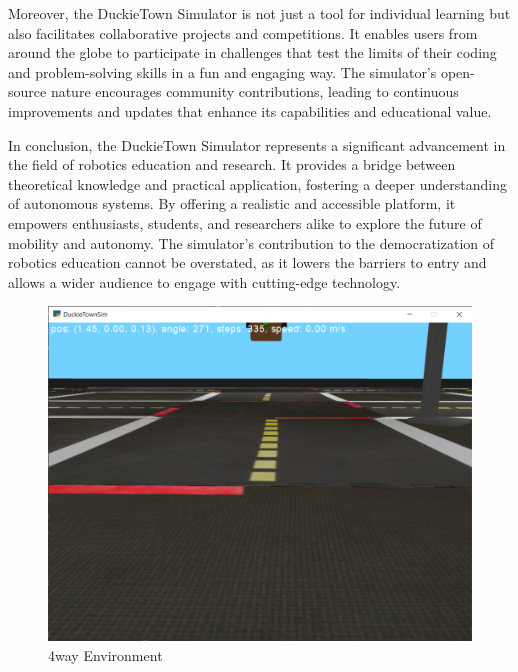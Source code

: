 \begin{spacing}{1.5}
\begin{sloppypar}
Moreover, the DuckieTown Simulator is not just a tool for individual learning but also facilitates collaborative projects and competitions. It enables users from around the globe to participate in challenges that test the limits of their coding and problem-solving skills in a fun and engaging way. The simulator's open-source nature encourages community contributions, leading to continuous improvements and updates that enhance its capabilities and educational value.

In conclusion, the DuckieTown Simulator represents a significant advancement in the field of robotics education and research. It provides a bridge between theoretical knowledge and practical application, fostering a deeper understanding of autonomous systems. By offering a realistic and accessible platform, it empowers enthusiasts, students, and researchers alike to explore the future of mobility and autonomy. The simulator's contribution to the democratization of robotics education cannot be overstated, as it lowers the barriers to entry and allows a wider audience to engage with cutting-edge technology.
\begin{figure}
    \centering
    \includegraphics[width=1\linewidth]{4/4way.png}
    \caption{4way Environment}
    \label{fig:4way}
\end{figure}


\end{sloppypar}
\end{spacing}

